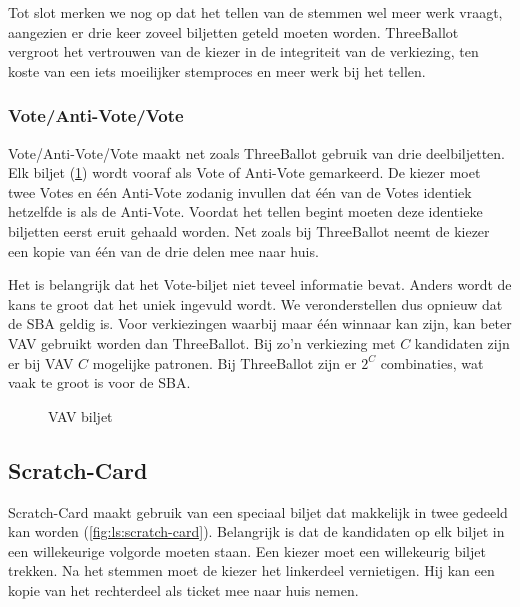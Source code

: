 \npar Tot slot merken we nog op dat het tellen van de stemmen wel meer werk vraagt, aangezien er drie keer zoveel biljetten geteld moeten worden. ThreeBallot vergroot het vertrouwen van de kiezer in de integriteit van de verkiezing, ten koste van een iets moeilijker stemproces en meer werk bij het tellen.

\subsubsection{Vote/Anti-Vote/Vote}
\label{sec:ls:vav}

Vote/Anti-Vote/Vote maakt net zoals ThreeBallot gebruik van drie deelbiljetten. Elk biljet (\ref{fig:ls:vav}) wordt vooraf als Vote of Anti-Vote gemarkeerd. De kiezer moet twee Votes en \'e\'en Anti-Vote zodanig invullen dat \'e\'en van de Votes identiek hetzelfde is als de Anti-Vote. Voordat het tellen begint moeten deze identieke biljetten eerst eruit gehaald worden. Net zoals bij ThreeBallot neemt de kiezer een kopie van \'e\'en van de drie delen mee naar huis.

\npar Het is belangrijk dat het Vote-biljet niet teveel informatie bevat. Anders wordt de kans te groot dat het uniek ingevuld wordt. We veronderstellen dus opnieuw dat de SBA geldig is. Voor verkiezingen waarbij maar \'e\'en winnaar kan zijn, kan beter VAV gebruikt worden dan ThreeBallot. Bij zo'n verkiezing met $C$ kandidaten zijn er bij VAV $C$ mogelijke patronen. Bij ThreeBallot zijn er $2^C$ combinaties, wat vaak te groot is voor de SBA.

\begin{figure}[H]
	\caption{VAV biljet\cite{rivest_smith_three_voting_protocols}}
	\label{fig:ls:vav}
\end{figure}

\subsection{Scratch-Card}
\label{sec:ls:scratch_card}

Scratch-Card\cite{randell_ryan_voting_technologies_and_trust} maakt gebruik van een speciaal biljet dat makkelijk in twee gedeeld kan worden (\ref{fig:ls:scratch-card}). Belangrijk is dat de kandidaten op elk biljet in een willekeurige volgorde moeten staan. Een kiezer moet een willekeurig biljet trekken. Na het stemmen moet de kiezer het linkerdeel vernietigen. Hij kan een kopie van het rechterdeel als ticket mee naar huis nemen.

